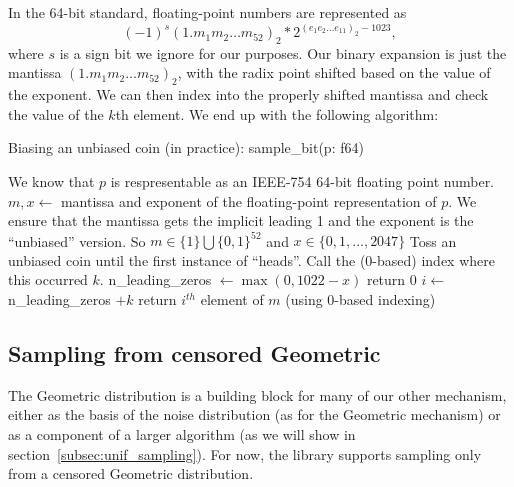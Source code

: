 \documentclass[11pt]{scrartcl} %
\begin{document}
In the 64-bit standard, floating-point numbers are represented as
\[ (-1)^s(1.m_1m_2 \hdots m_{52})_2 * 2^{(e_{1}e_2 \hdots e_{11})_2 - 1023}, \]
where $s$ is a sign bit we ignore for our purposes.
Our binary expansion is just the mantissa $(1.m_1m_2 \hdots m_{52})_2$, with
the radix point shifted based on the value of the exponent.
We can then index into the properly shifted mantissa and check the value of the $k$th element.
We end up with the following algorithm:
\begin{algorithm}[H]
	\caption{Biasing an unbiased coin (in practice): \newline sample\_bit(p: f64)}
	\label{alg:biasing_a_coin_practice}
	\begin{algorithmic}[1]
		\State We know that $p$ is respresentable as an IEEE-754 64-bit floating point number.
		\State $m, x \gets $ mantissa and exponent of the floating-point representation of $p$. 
		We ensure that the mantissa gets the implicit leading 1 and the exponent is the ``unbiased'' version.
		So $m \in \{1\} \bigcup \{0, 1\}^{52}$ and $x \in \{0, 1, \hdots, 2047\}$
		\State Toss an unbiased coin until the first instance of ``heads''. Call the (0-based) index where this occurred $k$.
		\State n\_leading\_zeros $\gets \max(0, 1022 - x)$
			\State return 0
		\Else
			\State $i \gets$ n\_leading\_zeros $+ k$
			\State return $i^{th}$ element of $m$ (using 0-based indexing)
		\EndIf
	\end{algorithmic}
\end{algorithm}

\subsection{Sampling from censored Geometric}
The Geometric distribution is a building block for many of our other mechanism, either as the basis of the 
noise distribution (as for the Geometric mechanism) or as a component of a larger algorithm (as we will show in 
section~\ref{subsec:unif_sampling}). For now, the library supports sampling only from a censored Geometric distribution. \newline 
\end{document}
